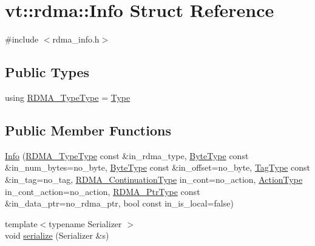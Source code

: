 \hypertarget{structvt_1_1rdma_1_1_info}{}\section{vt\+:\+:rdma\+:\+:Info Struct Reference}
\label{structvt_1_1rdma_1_1_info}


{\ttfamily \#include $<$rdma\+\_\+info.\+h$>$}

\subsection*{Public Types}
\begin{DoxyCompactItemize}
\item 
using \hyperlink{structvt_1_1rdma_1_1_info_afb608063c839ec0e8e124f3496542991}{R\+D\+M\+A\+\_\+\+Type\+Type} = \hyperlink{namespacevt_1_1rdma_ac848e1d9da43db6294bd06f83e5d3946}{Type}
\end{DoxyCompactItemize}
\subsection*{Public Member Functions}
\begin{DoxyCompactItemize}
\item 
\hyperlink{structvt_1_1rdma_1_1_info_a9f79490fb7f166889a8cfed10d158d38}{Info} (\hyperlink{namespacevt_1_1rdma_ac848e1d9da43db6294bd06f83e5d3946}{R\+D\+M\+A\+\_\+\+Type\+Type} const \&in\+\_\+rdma\+\_\+type, \hyperlink{namespacevt_aab8d55968084610ce3b17057981e9300}{Byte\+Type} const \&in\+\_\+num\+\_\+bytes=no\+\_\+byte, \hyperlink{namespacevt_aab8d55968084610ce3b17057981e9300}{Byte\+Type} const \&in\+\_\+offset=no\+\_\+byte, \hyperlink{namespacevt_a84ab281dae04a52a4b243d6bf62d0e52}{Tag\+Type} const \&in\+\_\+tag=no\+\_\+tag, \hyperlink{namespacevt_a9880273f1697d78c2171f8d8f044de51}{R\+D\+M\+A\+\_\+\+Continuation\+Type} in\+\_\+cont=no\+\_\+action, \hyperlink{namespacevt_ae0a5a7b18cc99d7b732cb4d44f46b0f3}{Action\+Type} in\+\_\+cont\+\_\+action=no\+\_\+action, \hyperlink{namespacevt_a9e2c953286c7616f7c218e9951790776}{R\+D\+M\+A\+\_\+\+Ptr\+Type} const \&in\+\_\+data\+\_\+ptr=no\+\_\+rdma\+\_\+ptr, bool const in\+\_\+is\+\_\+local=false)
\item 
{\footnotesize template$<$typename Serializer $>$ }\\void \hyperlink{structvt_1_1rdma_1_1_info_ac1e3590cb31c738ed6d3cedce09701c6}{serialize} (Serializer \&s)
\end{DoxyCompactItemize}
